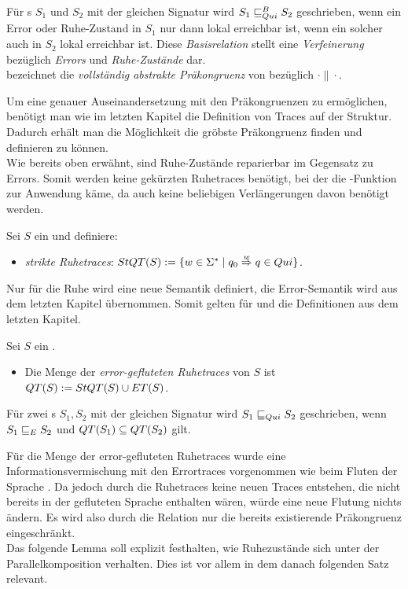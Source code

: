 \begin{Def}
  Für \EIO{}s $S_1$ und $S_2$ mit der gleichen Signatur wird
  $S_1\sqsubseteq _{Qui}^B S_2$ geschrieben, wenn ein Error oder Ruhe-Zustand in $S_1$ nur
  dann lokal erreichbar ist, wenn ein solcher auch in $S_2$ lokal erreichbar
  ist. Diese \emph{Basisrelation} stellt eine \emph{Verfeinerung} bezüglich
  \emph{Errors} und \emph{Ruhe-Zustände} dar.\\
  \QCRel{} bezeichnet die \emph{vollständig abstrakte Präkongruenz} von
  \QBRel{} bezüglich $\cdot\|\cdot$.
\end{Def}

Um eine genauer Auseinandersetzung mit den Präkongruenzen zu ermöglichen,
benötigt man wie im letzten Kapitel die Definition von Traces auf der Struktur.
Dadurch erhält man die Möglichkeit die gröbste Präkongruenz finden und
definieren zu können.\\
Wie bereits oben erwähnt, sind Ruhe-Zustände reparierbar im Gegensatz zu
Errors. Somit werden keine gekürzten Ruhetraces benötigt, bei der die
\prune{}-Funktion zur Anwendung käme, da auch keine beliebigen Verlängerungen
davon benötigt werden.

\begin{Def}[Ruhetraces]
  \label{DefRuhetraces}
  Sei $S$ ein \EIO{} und definiere:
  \begin{itemize}
    \item \emph{strikte Ruhetraces}: $StQT{}(S) := \{w\in\Sigma ^*\mid q_0
      \overset{w}{\Rightarrow} q\in Qui\}$.
  \end{itemize}
\end{Def}

Nur für die Ruhe wird eine neue Semantik definiert, die Error-Semantik wird aus
dem letzten Kapitel übernommen. Somit gelten für \ET{} und \EL{} die
Definitionen aus dem letzten Kapitel.

\begin{Def}
  \label{DefQTQL}
  Sei $S$ ein \EIO{}.
  \begin{itemize}
    \item Die Menge der \emph{error-gefluteten Ruhetraces} von $S$ ist
      $QT{}(S) := StQT{}(S)\cup ET{}(S)$.
  \end{itemize}
  Für zwei \EIO{}s $S_1, S_2$ mit der gleichen Signatur wird
  $S_1\sqsubseteq _{Qui} S_2$ geschrieben, wenn $S_1\sqsubseteq _E S_2$ und $QT{}(S_1)\subseteq QT{}(S_2)$ gilt.
\end{Def}

Für die Menge der error-gefluteten Ruhetraces \QT{} wurde eine Informationsvermischung
mit den Errortraces vorgenommen wie beim Fluten der Sprache \EL{}. Da jedoch
durch die Ruhetraces keine neuen Traces entstehen, die nicht bereits in der
gefluteten Sprache \EL{} enthalten wären, würde eine neue Flutung nichts
ändern. Es wird also durch die Relation \QRel{} nur die
bereits existierende Präkongruenz \ERel{} eingeschränkt.\\
Das folgende Lemma soll explizit festhalten, wie Ruhezustände sich unter der
Parallelkomposition verhalten. Dies ist vor allem in dem danach folgenden Satz
relevant.


